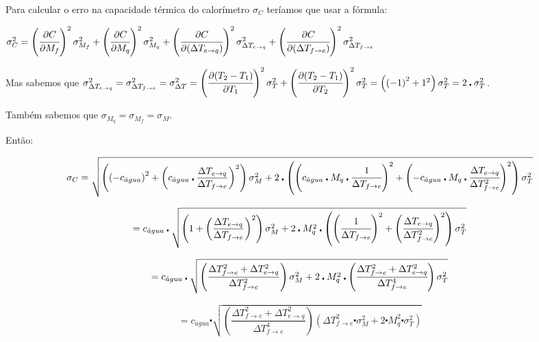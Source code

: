 \documentclass[a4paper]{article}
\begin{document}
			Para calcular o erro na capacidade térmica do calorímetro $\sigma_{C}$
			teríamos que usar a fórmula:

			$\sigma_{C}^{2}=\left(\cfrac{\partial C}{\partial M_{f}}\right)^{2}\sigma_{M_{f}}^{2}+\left(\cfrac{\partial C}{\partial M_{q}}\right)^{2}\sigma_{M_{q}}^{2}+\left(\cfrac{\partial C}{\partial(\Delta T_{e\rightarrow q})}\right)^{2}\sigma_{\Delta T_{e\rightarrow q}}^{2}+\left(\cfrac{\partial C}{\partial(\Delta T_{f\rightarrow e})}\right)^{2}\sigma_{\Delta T_{f\rightarrow e}}^{2}$

			Mas sabemos que $\sigma_{\Delta T_{e\rightarrow q}}^{2}=\sigma_{\Delta T_{f\rightarrow e}}^{2}=\sigma_{\Delta T}^{2}=\left(\cfrac{\partial(T_{2}-T_{1})}{\partial T_{1}}\right)^{2}\sigma_{T}^{2}+\left(\cfrac{\partial(T_{2}-T_{1})}{\partial T_{2}}\right)^{2}\sigma_{T}^{2}=\left(\left(-1\right)^{2}+1^{2}\right)\sigma_{T}^{2}=2\centerdot\sigma_{T}^{2}$.

			Também sabemos que $\sigma_{M_{q}}=\sigma_{M_{f}}=\sigma_{M}$.

			Então:

			\[
				\sigma_{C}=\sqrt{\left(\left(-c_{\acute{a}gua}\right)^{2}+\left(c_{\acute{a}gua}\centerdot\dfrac{\Delta T_{e\rightarrow q}}{\Delta T_{f\rightarrow e}}\right)^{2}\right)\sigma_{M}^{2}+2\centerdot\left(\left(c_{\acute{a}gua}\centerdot M_{q}\centerdot\cfrac{1}{\Delta T_{f\rightarrow e}}\right)^{2}+\left(-c_{\acute{a}gua}\centerdot M_{q}\centerdot\cfrac{\Delta T_{e\rightarrow q}}{\Delta T_{f\rightarrow e}^{2}}\right)^{2}\right)\sigma_{T}^{2}}
			\]


			\[
				=c_{\acute{a}gua}\centerdot\sqrt{\left(1+\left(\dfrac{\Delta T_{e\rightarrow q}}{\Delta T_{f\rightarrow e}}\right)^{2}\right)\sigma_{M}^{2}+2\centerdot M_{q}^{2}\centerdot\left(\left(\cfrac{1}{\Delta T_{f\rightarrow e}}\right)^{2}+\left(\cfrac{\Delta T_{e\rightarrow q}}{\Delta T_{f\rightarrow e}^{2}}\right)^{2}\right)\sigma_{T}^{2}}
			\]


			\[
				=c_{\acute{a}gua}\centerdot\sqrt{\left(\dfrac{\Delta T_{f\rightarrow e}^{2}+\Delta T_{e\rightarrow q}^{2}}{\Delta T_{f\rightarrow e}^{2}}\right)\sigma_{M}^{2}+2\centerdot M_{q}^{2}\centerdot\left(\cfrac{\Delta T_{f\rightarrow e}^{2}+\Delta T_{e\rightarrow q}^{2}}{\Delta T_{f\rightarrow e}^{4}}\right)\sigma_{T}^{2}}
			\]


			\[
				=c_{\acute{a}gua}\centerdot\sqrt{\left(\dfrac{\Delta T_{f\rightarrow e}^{2}+\Delta T_{e\rightarrow q}^{2}}{\Delta T_{f\rightarrow e}^{4}}\right)\left(\Delta T_{f\rightarrow e}^{2}\centerdot\sigma_{M}^{2}+2\centerdot M_{q}^{2}\centerdot\sigma_{T}^{2}\right)}
			\]
\end{document}
